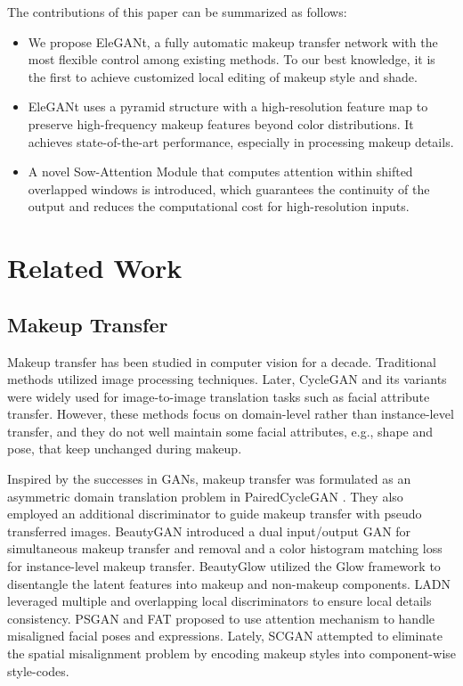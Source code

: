 The contributions of this paper can be summarized as follows:
\begin{itemize}
    \item We propose EleGANt, a fully automatic makeup transfer network with the most flexible control among existing methods. To our best knowledge, it is the first to achieve customized local editing of makeup style and shade.
    \item EleGANt uses a pyramid structure with a high-resolution feature map to preserve high-frequency makeup features beyond color distributions. It achieves state-of-the-art performance, especially in processing makeup details.
    \item A novel Sow-Attention Module that computes attention within shifted overlapped windows is introduced, which guarantees the continuity of the output and reduces the computational cost for high-resolution inputs.
\end{itemize}

\section{Related Work}
\subsection{Makeup Transfer}
Makeup transfer has been studied in computer vision for a decade. Traditional methods \cite{Example-1,Example-2,tradition-1,tradition-2,tradition-3} utilized image processing techniques. Later, CycleGAN \cite{CycleGAN} and its variants \cite{StarGAN,FDIT} were widely used for image-to-image translation tasks such as facial attribute transfer. However, these methods focus on domain-level rather than instance-level transfer, and they do not well maintain some facial attributes, e.g., shape and pose, that keep unchanged during makeup.

Inspired by the successes in GANs, makeup transfer was formulated as an asymmetric domain translation problem in PairedCycleGAN \cite{PairedCycleGAN}. They also employed an additional discriminator to guide makeup transfer with pseudo transferred images. %
BeautyGAN \cite{BeautyGAN} introduced a dual input/output GAN for simultaneous makeup transfer and removal and a color histogram matching loss for instance-level makeup transfer. BeautyGlow \cite{BeautyGlow} utilized the Glow framework to disentangle the latent features into makeup and non-makeup components. LADN \cite{LADN} leveraged multiple and overlapping local discriminators to ensure local details consistency. PSGAN \cite{PSGAN} and FAT \cite{FAT} proposed to use attention mechanism to handle misaligned facial poses and expressions. Lately, SCGAN \cite{SCGAN} attempted to eliminate the spatial misalignment problem by encoding makeup styles into component-wise style-codes. 

